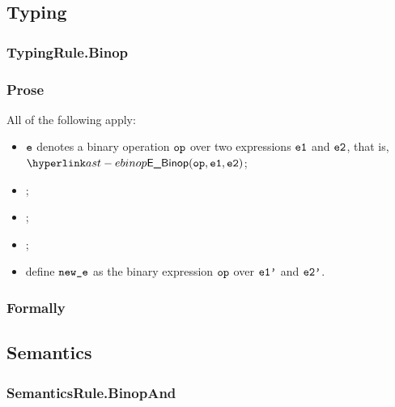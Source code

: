 \subsection{Typing}
\subsubsection{TypingRule.Binop\label{sec:TypingRule.Binop}}
\subsubsection{Prose}
All of the following apply:
\begin{itemize}
  \item $\ve$ denotes a binary operation $\op$ over two expressions $\veone$ and $\vetwo$, that is, \\ $\EBinop(\op, \veone, \vetwo)$;
  \item \Proseannotateexpr{$\veone$}{$\tenv$}{$(\vtone, \veonep)$\ProseOrTypeError};
  \item \Proseannotateexpr{$\vetwo$}{$\tenv$}{$(\vttwo, \vetwop)$\ProseOrTypeError};
  \item \Proseapplybinoptypes{$\tenv$}{\op}{\vtone}{\vttwo}{$\vt$\ProseOrTypeError};
  \item define $\newe$ as the binary expression $\op$ over $\veonep$ and $\vetwop$.
\end{itemize}
\subsubsection{Formally}
\begin{mathpar}
\end{mathpar}

\subsection{Semantics}
\subsubsection{SemanticsRule.BinopAnd \label{sec:SemanticsRule.BinopAnd}}
